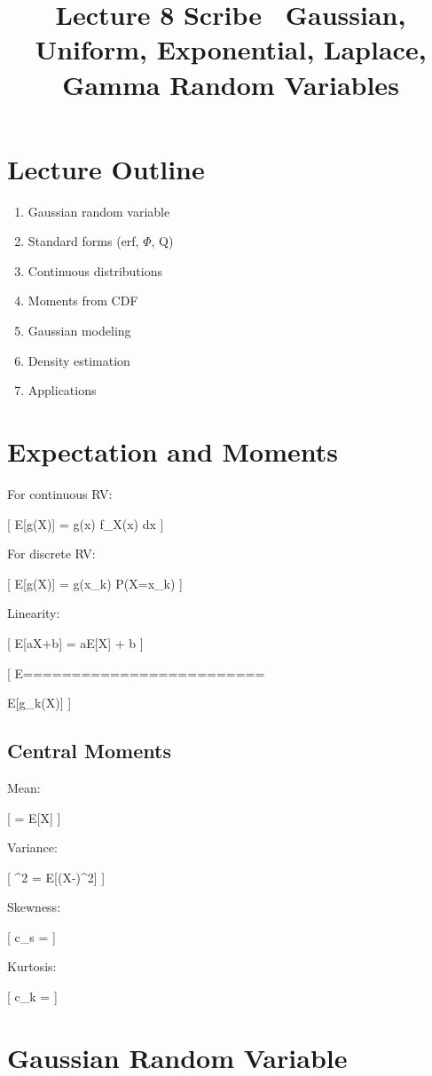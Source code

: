 \documentclass[12pt]{article}
\title{Lecture 8 Scribe \ Gaussian, Uniform, Exponential, Laplace, Gamma Random Variables}
\author{}
\date{}
\begin{document}
\maketitle

\section{Lecture Outline}

\begin{enumerate}
\item Gaussian random variable
\item Standard forms (erf, $\Phi$, Q)
\item Continuous distributions
\item Moments from CDF
\item Gaussian modeling
\item Density estimation
\item Applications
\end{enumerate}

\section{Expectation and Moments}

For continuous RV:

[
E[g(X)] = \int g(x) f_X(x) dx
]

For discrete RV:

[
E[g(X)] = \sum g(x_k) P(X=x_k)
]

Linearity:

[
E[aX+b] = aE[X] + b
]

[
E
=========================

\sum E[g_k(X)]
]

\subsection{Central Moments}

Mean:

[
\mu = E[X]
]

Variance:

[
\sigma^2 = E[(X-\mu)^2]
]

Skewness:

[
c_s =
]

Kurtosis:

[
c_k =
]

\section{Gaussian Random Variable}
\end{document}
